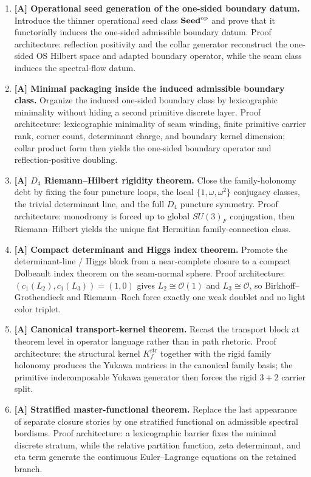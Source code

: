 \begin{tcolorbox}[colback=tfptblue!2, colframe=tfptblue!40, breakable,
    title={Version 4.5 completion surface}, colbacktitle=tfptblue!60]
\begin{enumerate}[leftmargin=1.5em, topsep=3pt, itemsep=4pt]
    \item \textbf{[A] Operational seed generation of the one-sided boundary datum.} Introduce the thinner operational seed class $\mathbf{Seed}^{\mathrm{op}}$ and prove that it functorially induces the one-sided admissible boundary datum. Proof architecture: reflection positivity and the collar generator reconstruct the one-sided OS Hilbert space and adapted boundary operator, while the seam class induces the spectral-flow datum.
    \item \textbf{[A] Minimal packaging inside the induced admissible boundary class.} Organize the induced one-sided boundary class by lexicographic minimality without hiding a second primitive discrete layer. Proof architecture: lexicographic minimality of seam winding, finite primitive carrier rank, corner count, determinant charge, and boundary kernel dimension; collar product form then yields the one-sided boundary operator and reflection-positive doubling.
    \item \textbf{[A] $D_4$ Riemann--Hilbert rigidity theorem.} Close the family-holonomy debt by fixing the four puncture loops, the local $\{1,\omega,\omega^2\}$ conjugacy classes, the trivial determinant line, and the full $D_4$ puncture symmetry. Proof architecture: monodromy is forced up to global $SU(3)_F$ conjugation, then Riemann--Hilbert yields the unique flat Hermitian family-connection class.
    \item \textbf{[A] Compact determinant and Higgs index theorem.} Promote the determinant-line / Higgs block from a near-complete closure to a compact Dolbeault index theorem on the seam-normal sphere. Proof architecture: $(c_1(L_2),c_1(L_3))=(1,0)$ gives $L_2\cong\mathcal O(1)$ and $L_3\cong\mathcal O$, so Birkhoff--Grothendieck and Riemann--Roch force exactly one weak doublet and no light color triplet.
    \item \textbf{[A] Canonical transport-kernel theorem.} Recast the transport block at theorem level in operator language rather than in path rhetoric. Proof architecture: the structural kernel $K_f^{\mathrm{str}}$ together with the rigid family holonomy produces the Yukawa matrices in the canonical family basis; the primitive indecomposable Yukawa generator then forces the rigid $3+2$ carrier split.
    \item \textbf{[A] Stratified master-functional theorem.} Replace the last appearance of separate closure stories by one stratified functional on admissible spectral bordisms. Proof architecture: a lexicographic barrier fixes the minimal discrete stratum, while the relative partition function, zeta determinant, and eta term generate the continuous Euler--Lagrange equations on the retained branch.

\end{enumerate}
\end{tcolorbox}
